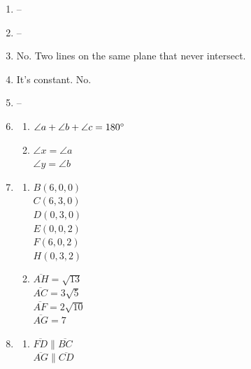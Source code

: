 \documentclass{article}
\begin{document}
\begin{enumerate}
\begin{enumerate}
	\end{enumerate}
	
\item --

\item --

\item No. Two lines on the same plane that never intersect.

\item It's constant. No.

\item --

\item 

	\begin{enumerate}
	
	\item $\angle a + \angle b + \angle c = 180 \degree$
	
	\item $\angle x  = \angle a$ \\
		$\angle y = \angle b$
	
	\end{enumerate}
	
\item

	\begin{enumerate}
	
	\item $B(6, 0, 0)$ \\
		$C(6, 3, 0)$ \\
		$D(0, 3, 0)$ \\
		$E(0, 0, 2)$ \\
		$F(6, 0, 2)$ \\
		$H(0, 3, 2)$
		
	\item $\overline{AH} = \sqrt{13}$ \\
		$\overline{AC} = 3\sqrt{5}$ \\
		$\overline{AF} = 2\sqrt{10}$ \\
		$\overline{AG} = 7$
	
	\end{enumerate}
	
\item

	\begin{enumerate}
	
	\item $\overline{FD} \parallel \overline{BC}$ \\
		$\overline{AG} \parallel \overline{CD}$
		

\end{enumerate}
\end{enumerate}
\end{document}
